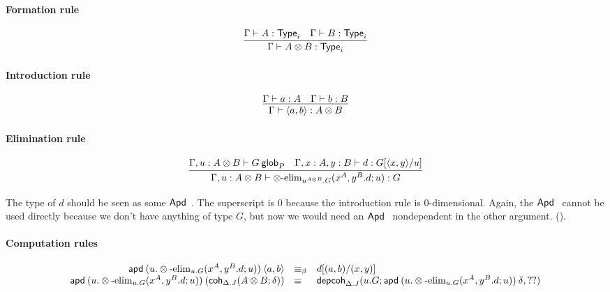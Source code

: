 \paragraph{Formation rule}

\begin{small}
  \[
  \infer{\wftype\Gamma{A\otimes B}} {\wftype\Gamma{A} & \wftype\Gamma{B}}
  \]
\end{small}

\paragraph{Introduction rule}

\begin{small}
  \[
  \infer{\ofglob{\Gamma}{\langle a, b\rangle}{A\otimes B}}
  {\ofglob{\Gamma}{a}{A}
    & \ofglob{\Gamma}{b}{B}}
  \]
\end{small}

\paragraph{Elimination rule}

\begin{small}
  \[
  \infer{\ofglob{\Gamma,u:A\otimes B}{\otimes\text{-elim}_{u^{A\otimes B}.G}
      {(x^A,y^B.d;u)}}{G}}
  {\wfglob{\Gamma,u:A\otimes B}{G}{P}
    & \ofglob{\Gamma,x:A,y:B}{d}{G[\langle x,y\rangle/u]}}
  \]
\end{small}

The type of $d$ should be seen as some $\mathsf{Apd} \: {} \: {}$. The superscript is
$0$ because the introduction rule is $0$-dimensional. Again, the
$\mathsf{Apd} \: {} \: {}$ cannot be used directly because we don’t have anything of
type $G$, but now we would need an $\mathsf{Apd} \: {} \: {}$ nondependent in the other
argument. ().

\paragraph{Computation rules}

\begin{small}
  \[
  \begin{array}{rll}
    \mathsf{apd} \: {(u.\otimes\text{-elim}_{u.G}
      {(x^A,y^B.d;u)})} \: {\langle a,b\rangle} & \equiv_\beta & d[(a,b)/(x,y)] \\
    \mathsf{apd} \: {(u.\otimes\text{-elim}_{u.G}
      {(x^A,y^B.d;u)})} \: {(\mathsf{coh}_{\Delta.J} ({A\otimes B};{\delta}))} & \equiv &
    \mathsf{depcoh}_{\Delta.J} ({u.G};{\mathsf{apd} \: {(u.\otimes\text{-elim}_{u.G}
      {(x^A,y^B.d;u)})} \: {\delta}},{??})
  \end{array}
  \]
\end{small}

